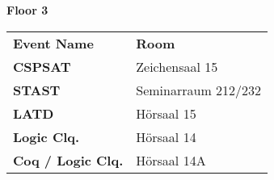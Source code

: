 \documentclass{article}
\begin{document}

\vspace{0.7cm}

\begin{vsltext}{3.0cm}{3.2cm}
    \begin{center}
        {\color{areagreen}\textbf{Floor 3}}
    \end{center}
\end{vsltext}

\vspace{1.2cm}

\newcommand\FB[1]{\textbf{\color{vslblue} #1}}

\begin{vsltext}{1.4cm}{2.0cm}
\begin{center}
    \begin{tabularx}{0.9\textwidth}{ X l }
        \textbf{Event Name} & \textbf{Room} \\
        \FB{CSPSAT} & Zeichensaal 15 \\
        \FB{STAST} & Seminarraum 212/232 \\
        \FB{LATD} & Hörsaal 15 \\
        \FB{Logic Clq.} & Hörsaal 14 \\
        \FB{Coq / Logic Clq.} & Hörsaal 14A \\
\end{tabularx}
\end{center}
\end{vsltext}
\end{document}

